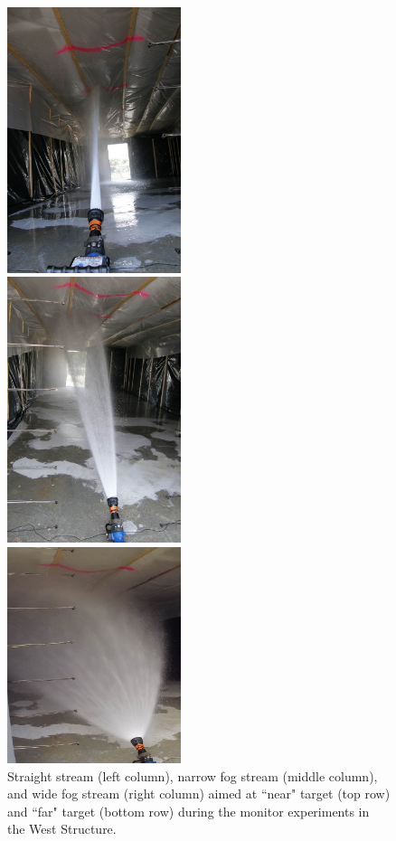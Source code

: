 \documentclass[12pt,oneside]{book}
\begin{document}
\begin{figure}[!ht]
\begin{center}
	\end{center}
	\endminipage \hfill
	\vspace{0.15in}
	\minipage{2.15in}
	\begin{center}
		\includegraphics[width=2in]{../Figures/Pictures/SS_far}
	\end{center} 
	\endminipage \hfill
	\minipage{2.15in}
	\begin{center}
		\includegraphics[width=2in]{../Figures/Pictures/NF_far}
	\end{center}
	\endminipage \hfill
	\minipage{2.15in}
	\begin{center}
		\includegraphics[width=2in]{../Figures/Pictures/WF_far}
	\end{center}
	\endminipage \hfill
	\caption[Straight stream, narrow fog stream, and wide fog stream aimed at the near and far targets in the West Structure.]{Straight stream (left column), narrow fog stream (middle column), and wide fog stream (right column) aimed at ``near" target (top row) and ``far" target (bottom row) during the monitor experiments in the West Structure.}
	\label{fig:test_16_17_pic}
\end{figure}
\FloatBarrier
\end{document}
